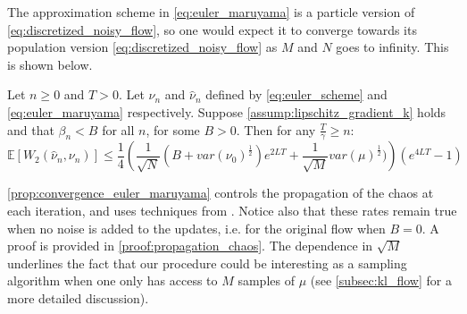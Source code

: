 The approximation scheme in \cref{eq:euler_maruyama} is a particle version of \cref{eq:discretized_noisy_flow}, so one would expect it to converge towards its population version  \cref{eq:discretized_noisy_flow} as $M$ and $N$ goes to infinity. This is shown below.
\begin{theorem}\label{prop:convergence_euler_maruyama}
 Let $n\ge 0$ and $T>0$. Let $\nu_n$ and $\hat{\nu}_n$ defined by \eqref{eq:euler_scheme} and \eqref{eq:euler_maruyama} respectively. Suppose \cref{assump:lipschitz_gradient_k} holds and that $\beta_n<B$ for all $n$, for some $B>0$. Then for any $\frac{T}{\gamma}\geq n$:
\[
\mathbb{E}[W_{2}(\hat{\nu}_{n},\nu_{n})]\leq \frac{1}{4}\left(\frac{1}{\sqrt{N}}(B+var(\nu_{0})^{\frac{1}{2}})e^{2LT}+\frac{1}{\sqrt{M}}var(\mu)^{\frac{1}{2}})\right)(e^{4LT}-1)
\]
\end{theorem}
\cref{prop:convergence_euler_maruyama} controls the propagation of the chaos at each iteration, and uses techniques from \cite{jourdain2007nonlinear}. Notice also that these rates remain true when no noise is added to the updates, i.e. for the original flow when $B=0$. A proof is provided in \cref{proof:propagation_chaos}. The dependence in $\sqrt{M}$ underlines the fact that our procedure could be interesting as a sampling algorithm when one only has access to $M$ samples of $\mu$ (see \cref{subsec:kl_flow} for a more detailed discussion).

